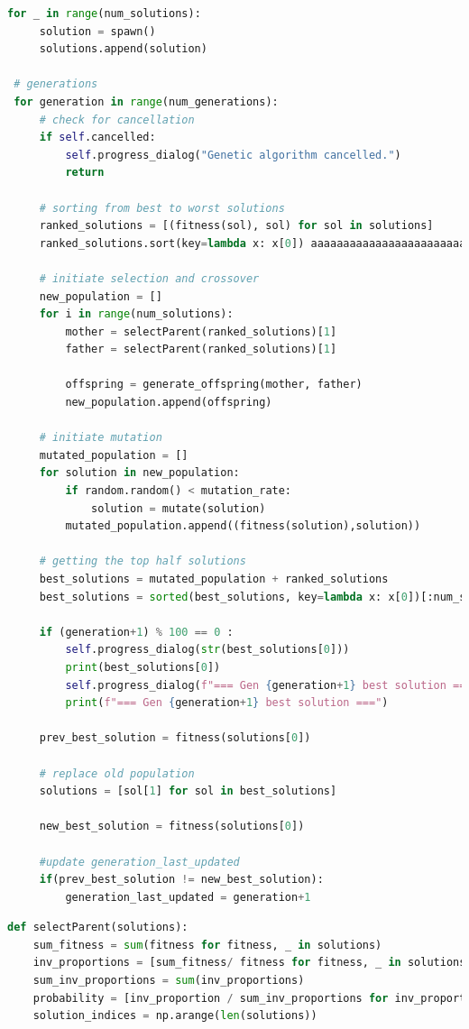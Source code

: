 \begin{appendices}
\begin{centerappendixtitle}
\begin{lstlisting}[language=Python, caption={Genetic Algorithm}, label={genalgoCode}, breaklines=true]
 for _ in range(num_solutions):
     solution = spawn()
     solutions.append(solution)

 # generations
 for generation in range(num_generations):
     # check for cancellation
     if self.cancelled:
         self.progress_dialog("Genetic algorithm cancelled.")
         return

     # sorting from best to worst solutions
     ranked_solutions = [(fitness(sol), sol) for sol in solutions]
     ranked_solutions.sort(key=lambda x: x[0]) aaaaaaaaaaaaaaaaaaaaaaaaaaaaaaaaaaaaaaaaaaaaaaaaaaa

     # initiate selection and crossover
     new_population = []
     for i in range(num_solutions):
         mother = selectParent(ranked_solutions)[1]
         father = selectParent(ranked_solutions)[1]

         offspring = generate_offspring(mother, father)
         new_population.append(offspring)

     # initiate mutation
     mutated_population = []
     for solution in new_population:
         if random.random() < mutation_rate:
             solution = mutate(solution)
         mutated_population.append((fitness(solution),solution))

     # getting the top half solutions
     best_solutions = mutated_population + ranked_solutions
     best_solutions = sorted(best_solutions, key=lambda x: x[0])[:num_solutions] 

     if (generation+1) % 100 == 0 :
         self.progress_dialog(str(best_solutions[0]))
         print(best_solutions[0])
         self.progress_dialog(f"=== Gen {generation+1} best solution ===")
         print(f"=== Gen {generation+1} best solution ===")

     prev_best_solution = fitness(solutions[0])

     # replace old population
     solutions = [sol[1] for sol in best_solutions]

     new_best_solution = fitness(solutions[0])

     #update generation_last_updated
     if(prev_best_solution != new_best_solution):
         generation_last_updated = generation+1
\end{lstlisting}
		
\begin{lstlisting}[language=Python,caption={Genetic Algorithm - Selection}, label={selectionCode}]
def selectParent(solutions):
	sum_fitness = sum(fitness for fitness, _ in solutions)
	inv_proportions = [sum_fitness/ fitness for fitness, _ in solutions]
	sum_inv_proportions = sum(inv_proportions)
	probability = [inv_proportion / sum_inv_proportions for inv_proportion in inv_proportions]
	solution_indices = np.arange(len(solutions))
	

\end{lstlisting}
\end{centerappendixtitle}
\end{appendices}
